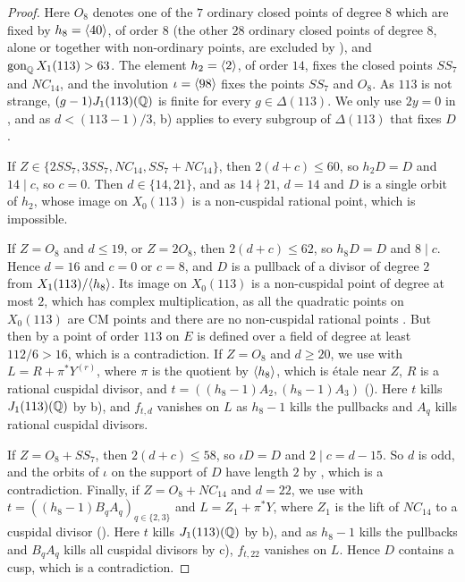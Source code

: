 \begin{proof}
Here $O_8$ denotes one of the $7$ ordinary closed points of degree $8$ which are fixed by $h_8=\langle 40\rangle$, of order $8$ (the other $28$ ordinary closed points of degree $8$, alone or together with non-ordinary points, are excluded by ), and $\operatorname{gon}_{\mathbb{Q}} X_1(113)>63$. The element $h_2=\langle 2\rangle$, of order $14$, fixes the closed points $SS_7$ and $NC_{14}$, and the involution $\iota=\langle 98\rangle$ fixes the points $SS_7$ and $O_8$. As $113$ is not strange, $(g-1)J_1(113)(\mathbb{Q})$ is finite for every $g\in\Delta(113)$. We only use $2y=0$ in , and as $d<(113-1)/3$,  b) applies to every subgroup of $\Delta(113)$ that fixes $D$.

If $Z\in\{2SS_7,3SS_7,NC_{14},SS_7+NC_{14}\}$, then $2(d+c)\leq 60$, so $h_2D=D$ and $14\mid c$, so $c=0$. Then $d\in\{14,21\}$, and as $14\nmid21$, $d=14$ and $D$ is a single orbit of $h_2$, whose image on $X_0(113)$ is a non-cuspidal rational point, which is impossible.

If $Z=O_8$ and $d\leq19$, or $Z=2O_8$, then $2(d+c)\leq 62$, so $h_8D=D$ and $8\mid c$. Hence $d=16$ and $c=0$ or $c=8$, and $D$ is a pullback of a divisor of degree $2$ from $X_1(113)/\langle h_8\rangle$. Its image on $X_0(113)$ is a non-cuspidal point of degree at most $2$, which has complex multiplication, as all the quadratic points on $X_0(113)$ are CM points \cite[Table 14]{AKMNOV} and there are no non-cuspidal rational points \cite[Theorem 1]{mazur78}. But then by  a point of order $113$ on $E$ is defined over a field of degree at least $112/6>16$, which is a contradiction. If $Z=O_8$ and $d\geq 20$, we use  with $L=R+\pi^*Y^{(r)}$, where $\pi$ is the quotient by $\langle h_8\rangle$, which is \'etale near $Z$, $R$ is a rational cuspidal divisor, and $t=((h_8-1)A_2,(h_8-1)A_3)$ (). Here $t$ kills $J_1(113)(\mathbb{Q})$ by  b), and $f_{t,d}$ vanishes on $L$ as $h_8-1$ kills the pullbacks and $A_q$ kills rational cuspidal divisors.

If $Z=O_8+SS_7$, then $2(d+c)\leq 58$, so $\iota D=D$ and $2\mid c=d-15$. So $d$ is odd, and the orbits of $\iota$ on the support of $D$ have length $2$ by , which is a contradiction. Finally, if $Z=O_8+NC_{14}$ and $d=22$, we use  with $t=((h_8-1)B_qA_q)_{q\in\{2,3\}}$ and $L=Z_1+\pi^*Y$, where $Z_1$ is the lift of $NC_{14}$ to a cuspidal divisor (). Here $t$ kills $J_1(113)(\mathbb{Q})$ by  b), and as $h_8-1$ kills the pullbacks and $B_qA_q$ kills all cuspidal divisors by  c), $f_{t,22}$ vanishes on $L$. Hence $D$ contains a cusp, which is a contradiction.
\end{proof}


